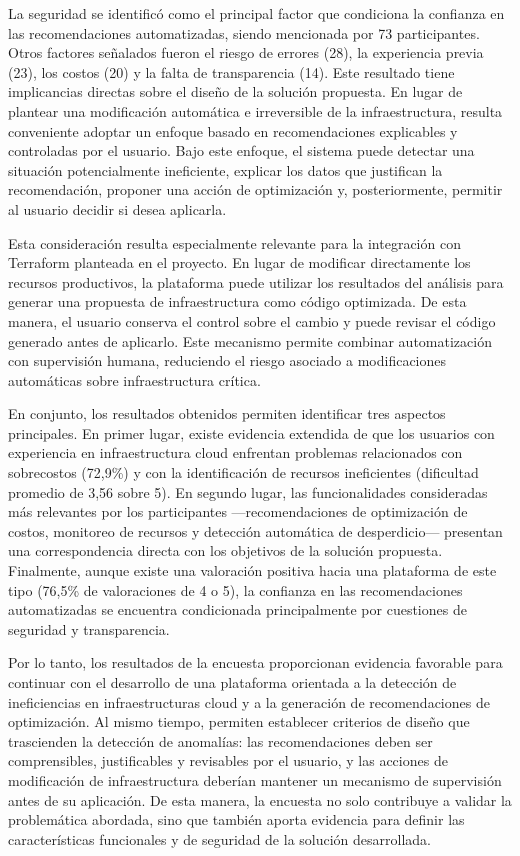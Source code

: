 \documentclass[a4paper, 12pt, oneside, openany]{book}
\begin{document}
La seguridad se identificó como el principal factor que condiciona la confianza en las recomendaciones automatizadas, siendo mencionada por 73 participantes. Otros factores señalados fueron el riesgo de errores (28), la experiencia previa (23), los costos (20) y la falta de transparencia (14). Este resultado tiene implicancias directas sobre el diseño de la solución propuesta. En lugar de plantear una modificación automática e irreversible de la infraestructura, resulta conveniente adoptar un enfoque basado en recomendaciones explicables y controladas por el usuario. Bajo este enfoque, el sistema puede detectar una situación potencialmente ineficiente, explicar los datos que justifican la recomendación, proponer una acción de optimización y, posteriormente, permitir al usuario decidir si desea aplicarla.

Esta consideración resulta especialmente relevante para la integración con Terraform planteada en el proyecto. En lugar de modificar directamente los recursos productivos, la plataforma puede utilizar los resultados del análisis para generar una propuesta de infraestructura como código optimizada. De esta manera, el usuario conserva el control sobre el cambio y puede revisar el código generado antes de aplicarlo. Este mecanismo permite combinar automatización con supervisión humana, reduciendo el riesgo asociado a modificaciones automáticas sobre infraestructura crítica.

En conjunto, los resultados obtenidos permiten identificar tres aspectos principales. En primer lugar, existe evidencia extendida de que los usuarios con experiencia en infraestructura cloud enfrentan problemas relacionados con sobrecostos (72,9\%) y con la identificación de recursos ineficientes (dificultad promedio de 3,56 sobre 5). En segundo lugar, las funcionalidades consideradas más relevantes por los participantes —recomendaciones de optimización de costos, monitoreo de recursos y detección automática de desperdicio— presentan una correspondencia directa con los objetivos de la solución propuesta. Finalmente, aunque existe una valoración positiva hacia una plataforma de este tipo (76,5\% de valoraciones de 4 o 5), la confianza en las recomendaciones automatizadas se encuentra condicionada principalmente por cuestiones de seguridad y transparencia.

Por lo tanto, los resultados de la encuesta proporcionan evidencia favorable para continuar con el desarrollo de una plataforma orientada a la detección de ineficiencias en infraestructuras cloud y a la generación de recomendaciones de optimización. Al mismo tiempo, permiten establecer criterios de diseño que trascienden la detección de anomalías: las recomendaciones deben ser comprensibles, justificables y revisables por el usuario, y las acciones de modificación de infraestructura deberían mantener un mecanismo de supervisión antes de su aplicación. De esta manera, la encuesta no solo contribuye a validar la problemática abordada, sino que también aporta evidencia para definir las características funcionales y de seguridad de la solución desarrollada.
\end{document}
